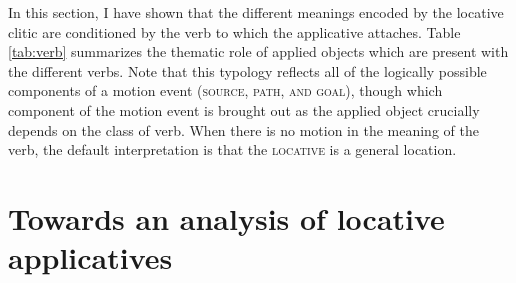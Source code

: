\documentclass[output=paper]{langsci/langscibook}
\begin{document}
In this section, I have shown that the different meanings encoded by the locative clitic are conditioned by the verb to which the applicative attaches. Table \ref{tab:verb} summarizes the thematic role of applied objects which are present with the different verbs. Note that this typology reflects all of the logically possible components of a motion event ({\scshape source, path, and goal}), though which component of the motion event is brought out as the applied object crucially depends on the class of verb. When there is no motion in the meaning of the verb, the default interpretation is that the {\scshape locative} is a general location. 

\begin{table}
\caption{\textbf{Verb classes and corresponding applied object meaning}}
	
\label{tab:verb} 

\end{table}








\section{Towards an analysis of locative applicatives}%

\label{sec:jerro:5}
\end{document}
